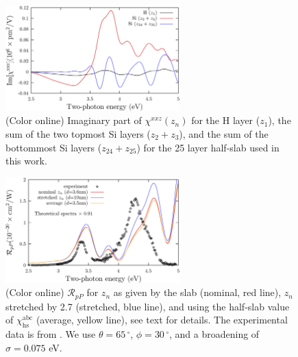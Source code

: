 \documentclass[utf8]{frontiersSCNS}
\begin{document}
\begin{figure}[b]
\centering 
\includegraphics[width=0.6\textwidth]{fig2}
\caption{(Color online) 
Imaginary part of $\chi^{xxz}(z_{n})$ for the H layer ($z_1$), the sum of the
two topmost Si layers ($z_{2} + z_{3}$), and the sum of the bottommost Si layers
($z_{24 }+ z_{25}$) for the 25 layer half-slab used in this work.}
\label{fig2}
\end{figure}

\begin{figure}[b]
\centering 
\includegraphics[width=0.6\textwidth]{fig3}
\caption{(Color online) $\mathcal{R}_{pP}$ for $z_{n}$ as given by the slab
(nominal, red line), $z_{n}$ stretched by 2.7 (stretched, blue line), and using
the half-slab value of $\chi^{\mathrm{abc}}_{\mathrm{hs}}$ (average, yellow
line), see text for details. The experimental data is from \cite{mejiaPRB02}. We
use $\theta = 65\,^{\circ}$, $\phi = 30\,^{\circ}$, and a broadening of $\sigma
= 0.075$ eV.}
\label{fig3}
\end{figure}
\end{document}

